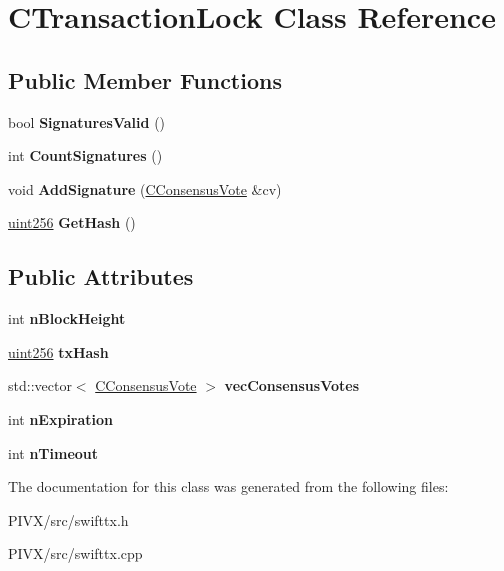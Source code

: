 \hypertarget{class_c_transaction_lock}{}\section{C\+Transaction\+Lock Class Reference}
\label{class_c_transaction_lock}
\subsection*{Public Member Functions}
\begin{DoxyCompactItemize}
\item 
\mbox{\label{class_c_transaction_lock_a71cb6705a8f0bfb4a8453d3b284e3cf7}} 
bool {\bfseries Signatures\+Valid} ()
\item 
\mbox{\label{class_c_transaction_lock_aa74b16eec6daee397785a91193fc3306}} 
int {\bfseries Count\+Signatures} ()
\item 
\mbox{\label{class_c_transaction_lock_a8f09c2c0453950fb6deadcccf5f518d7}} 
void {\bfseries Add\+Signature} (\mbox{\hyperlink{class_c_consensus_vote}{C\+Consensus\+Vote}} \&cv)
\item 
\mbox{\label{class_c_transaction_lock_a2142d2e27db93d33ac93761058f8d803}} 
\mbox{\hyperlink{classuint256}{uint256}} {\bfseries Get\+Hash} ()
\end{DoxyCompactItemize}
\subsection*{Public Attributes}
\begin{DoxyCompactItemize}
\item 
\mbox{\label{class_c_transaction_lock_a358a18da2b8b378cc7cd1dae145f611f}} 
int {\bfseries n\+Block\+Height}
\item 
\mbox{\label{class_c_transaction_lock_a9d4babccfcdf7fe3806dd3ec1b56d08a}} 
\mbox{\hyperlink{classuint256}{uint256}} {\bfseries tx\+Hash}
\item 
\mbox{\label{class_c_transaction_lock_a399f0d14a38794034c5f530599e95b3a}} 
std\+::vector$<$ \mbox{\hyperlink{class_c_consensus_vote}{C\+Consensus\+Vote}} $>$ {\bfseries vec\+Consensus\+Votes}
\item 
\mbox{\label{class_c_transaction_lock_aec15172be9c7f1cbe4b989387fdb1b52}} 
int {\bfseries n\+Expiration}
\item 
\mbox{\label{class_c_transaction_lock_a8c18d2530bfcea24bee8d5773d12c0a9}} 
int {\bfseries n\+Timeout}
\end{DoxyCompactItemize}


The documentation for this class was generated from the following files\+:\begin{DoxyCompactItemize}
\item 
P\+I\+V\+X/src/swifttx.\+h\item 
P\+I\+V\+X/src/swifttx.\+cpp\end{DoxyCompactItemize}
